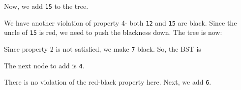 \documentclass[a4paper, openany]{memoir}
\begin{document}
Now, we add \texttt{15} to the tree.
\begin{center}
\end{center}
We have another violation of property 4- both \texttt{12} and \texttt{15} are black. Since the uncle of \texttt{15} is red, we need to push the blackness down. The tree is now:
\begin{center}
\end{center}
Since property 2 is not satisfied, we make \texttt{7} black. So, the BST is
\begin{center}
\end{center}
The next node to add is \texttt{4}. 
\begin{center}
\end{center}
There is no violation of the red-black property here. Next, we add \texttt{6}.
\end{document}

